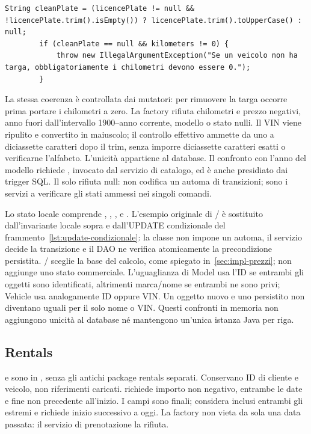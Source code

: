 \noindent\begin{minipage}{\linewidth}
\begin{lstlisting}[firstnumber=59,caption={\code{Vehicle.java}: normalizzazione della targa e coerenza con i chilometri.},
  label=lst:vehicle-invariante]
        String cleanPlate = (licencePlate != null && !licencePlate.trim().isEmpty()) ? licencePlate.trim().toUpperCase() : null;
        if (cleanPlate == null && kilometers != 0) {
            throw new IllegalArgumentException("Se un veicolo non ha targa, obbligatoriamente i chilometri devono essere 0.");
        }
\end{lstlisting}
\end{minipage}


La stessa coerenza è controllata dai mutatori: per rimuovere la targa occorre
prima portare i chilometri a zero. La factory rifiuta chilometri e prezzo
negativi, anno fuori dall'intervallo 1900--anno corrente, modello o stato
nulli. Il VIN viene ripulito e convertito in maiuscolo; il controllo
effettivo ammette da uno a diciassette caratteri dopo il trim, senza imporre
diciassette caratteri esatti o verificarne l'alfabeto. L'unicità appartiene
al database. Il confronto con l'anno del modello richiede
, invocato dal servizio di catalogo, ed è
anche presidiato dai trigger SQL. Il solo  rifiuta null:
non codifica un automa di transizioni; sono i servizi a verificare gli stati
ammessi nei singoli comandi.

Lo stato locale  comprende , ,
,  e . L'esempio originale di
/ è sostituito dall'invariante locale sopra e
dall'UPDATE condizionale del frammento~\ref{lst:update-condizionale}:
la classe non impone un automa, il servizio decide la transizione e il DAO
ne verifica atomicamente la precondizione persistita.
/ sceglie la base del calcolo,
come spiegato in~\ref{sec:impl-prezzi}; non aggiunge uno stato commerciale.
L'uguaglianza di Model usa l'ID se entrambi gli oggetti sono identificati,
altrimenti marca/nome se entrambi ne sono privi; Vehicle usa analogamente
ID oppure VIN. Un oggetto nuovo e uno persistito non diventano uguali
per il solo nome o VIN. Questi confronti in memoria non aggiungono
unicità al database né mantengono un'unica istanza Java per riga.

\subsection{Rentals}
 e  sono in , senza
gli antichi package rentals separati. Conservano ID di cliente e veicolo,
non riferimenti caricati.  richiede importo non negativo,
entrambe le date  e fine non precedente all'inizio.
I campi sono finali;  considera inclusi entrambi gli
estremi e  richiede inizio successivo a oggi. La factory
non vieta da sola una data passata: il servizio di prenotazione la rifiuta.

